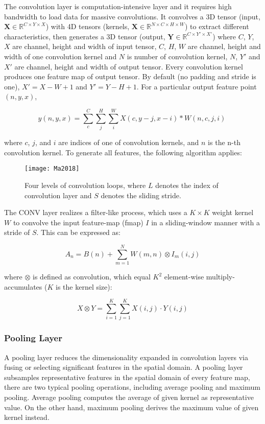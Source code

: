 The convolution layer is computation-intensive layer and it requires high bandwidth to load data for massive convolutions. It convolves a 3D tensor (input, $\mathbf{X}\in \mathbb{R}^{C\times Y\times X}$) with 4D tensors (kernels, $\mathbf{X}\in \mathbb{R}^{N\times C\times H\times W}$) to extract different characteristics, then generates a 3D tensor (output, $\mathbf{Y}\in \mathbb{R}^{C\times Y'\times X'}$) where $C$, $Y$, $X$ are channel, height and width of input tensor, $C$, $H$, $W$ are channel, height and width of one convolution kernel and $N$ is number of convolution kernel, $N$, $Y'$ and $X'$ are channel, height and width of output tensor. Every convolution kernel produces one feature map of output tensor. By default (no padding and stride is one), $X' = X-W+1$ and $Y'=Y-H+1$. For a particular output feature point $(n,y,x)$, 

\[
y(n,y,x) = \sum^C_c\sum^H_j\sum^W_i X(c,y-j,x-i)*W(n,c,j,i)\
\]

\noindent
where $c$, $j$, and $i$ are indices of one of convolution kernels, and $n$ is the n-th convolution kernel. To generate all features, the following algorithm applies:

\begin{figure}
\texttt{[image: Ma2018]}
\caption{Four levels of convolution loops, where $L$ denotes the index of convolution layer and $S$ denotes the sliding stride. }
\end{figure}


The CONV layer realizes a filter-like process, 
which uses a 
$K \times K$ weight kernel $W$
to convolve the input feature-map (fmap) 
$I$ in a sliding-window manner with a stride of $S$. This can be expressed as:

\[
A_n = B(n) + \sum_{m=1}^NW(m,n) \otimes I_m(i,j)
\]

\noindent 
where $\otimes$ is defined as convolution, which equal $K^2$ element-wise multiply-accumulates ($K$ is the kernel size):

\[
X \otimes Y = \sum_{i=1}^K\sum_{j=1}^KX(i,j)\cdot Y(i,j)
\]

\subsubsection*{Pooling Layer}

A pooling layer reduces the dimensionality expanded in convolution layers via fusing or selecting significant features in the spatial domain.
A pooling layer subsamples representative features in the spatial domain of every feature map, there
are two typical pooling operations, including average pooling
and maximum pooling. Average pooling computes the average
of given kernel as representative value. On the other hand,
maximum pooling derives the maximum value of given kernel
instead.

